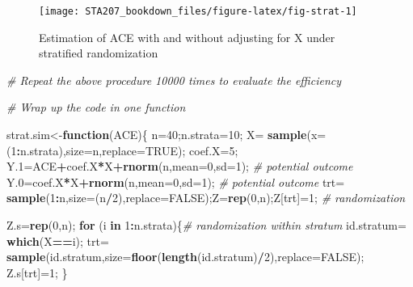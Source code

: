 \documentclass[12pt,]{book}
\newenvironment{Shaded}{\begin{snugshade}}{\end{snugshade}}
\newcommand{\KeywordTok}[1]{\textcolor[rgb]{0.13,0.29,0.53}{\textbf{#1}}}
\newcommand{\DataTypeTok}[1]{\textcolor[rgb]{0.13,0.29,0.53}{#1}}
\newcommand{\DecValTok}[1]{\textcolor[rgb]{0.00,0.00,0.81}{#1}}
\newcommand{\StringTok}[1]{\textcolor[rgb]{0.31,0.60,0.02}{#1}}
\newcommand{\CommentTok}[1]{\textcolor[rgb]{0.56,0.35,0.01}{\textit{#1}}}
\newcommand{\OtherTok}[1]{\textcolor[rgb]{0.56,0.35,0.01}{#1}}
\newcommand{\ControlFlowTok}[1]{\textcolor[rgb]{0.13,0.29,0.53}{\textbf{#1}}}
\newcommand{\OperatorTok}[1]{\textcolor[rgb]{0.81,0.36,0.00}{\textbf{#1}}}
\newcommand{\NormalTok}[1]{#1}
\begin{document}
\begin{figure}

{\centering \texttt{[image: STA207\_bookdown\_files/figure-latex/fig-strat-1]} 

}

\caption{Estimation of ACE with and without adjusting for X under stratified randomization}\label{fig:fig-strat}
\end{figure}

\begin{Shaded}
\begin{Highlighting}[]
\CommentTok{# Repeat the above procedure 10000 times to evaluate the efficiency }

\CommentTok{# Wrap up the code in one function }

\NormalTok{strat.sim<-}\ControlFlowTok{function}\NormalTok{(ACE)\{ }
\NormalTok{n=}\DecValTok{40}\NormalTok{;n.strata=}\DecValTok{10}\NormalTok{;}
\NormalTok{X=}\StringTok{ }\KeywordTok{sample}\NormalTok{(}\DataTypeTok{x=}\NormalTok{(}\DecValTok{1}\OperatorTok{:}\NormalTok{n.strata),}\DataTypeTok{size=}\NormalTok{n,}\DataTypeTok{replace=}\OtherTok{TRUE}\NormalTok{);}
\NormalTok{ coef.X=}\DecValTok{5}\NormalTok{; }
\NormalTok{Y.}\DecValTok{1}\NormalTok{=ACE}\OperatorTok{+}\NormalTok{coef.X}\OperatorTok{*}\NormalTok{X}\OperatorTok{+}\KeywordTok{rnorm}\NormalTok{(n,}\DataTypeTok{mean=}\DecValTok{0}\NormalTok{,}\DataTypeTok{sd=}\DecValTok{1}\NormalTok{); }\CommentTok{# potential outcome}
\NormalTok{Y.}\DecValTok{0}\NormalTok{=coef.X}\OperatorTok{*}\NormalTok{X}\OperatorTok{+}\KeywordTok{rnorm}\NormalTok{(n,}\DataTypeTok{mean=}\DecValTok{0}\NormalTok{,}\DataTypeTok{sd=}\DecValTok{1}\NormalTok{); }\CommentTok{# potential outcome }
\NormalTok{trt=}\StringTok{ }\KeywordTok{sample}\NormalTok{(}\DecValTok{1}\OperatorTok{:}\NormalTok{n,}\DataTypeTok{size=}\NormalTok{(n}\OperatorTok{/}\DecValTok{2}\NormalTok{),}\DataTypeTok{replace=}\OtherTok{FALSE}\NormalTok{);Z=}\KeywordTok{rep}\NormalTok{(}\DecValTok{0}\NormalTok{,n);Z[trt]=}\DecValTok{1}\NormalTok{; }\CommentTok{# randomization}

\NormalTok{Z.s=}\KeywordTok{rep}\NormalTok{(}\DecValTok{0}\NormalTok{,n);}
\ControlFlowTok{for}\NormalTok{ (i }\ControlFlowTok{in} \DecValTok{1}\OperatorTok{:}\NormalTok{n.strata)\{}\CommentTok{# randomization within stratum }
\NormalTok{  id.stratum=}\StringTok{ }\KeywordTok{which}\NormalTok{(X}\OperatorTok{==}\NormalTok{i);}
\NormalTok{  trt=}\StringTok{ }\KeywordTok{sample}\NormalTok{(id.stratum,}\DataTypeTok{size=}\KeywordTok{floor}\NormalTok{(}\KeywordTok{length}\NormalTok{(id.stratum)}\OperatorTok{/}\DecValTok{2}\NormalTok{),}\DataTypeTok{replace=}\OtherTok{FALSE}\NormalTok{);}
\NormalTok{  Z.s[trt]=}\DecValTok{1}\NormalTok{; }
\NormalTok{\}}


\end{Highlighting}
\end{Shaded}
\end{document}
